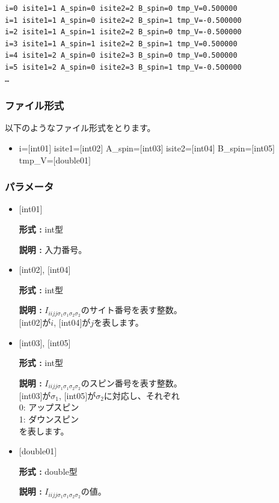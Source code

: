 \begin{minipage}{12.5cm}
\begin{screen}
\begin{verbatim}
i=0 isite1=1 A_spin=0 isite2=2 B_spin=0 tmp_V=0.500000 
i=1 isite1=1 A_spin=0 isite2=2 B_spin=1 tmp_V=-0.500000 
i=2 isite1=1 A_spin=1 isite2=2 B_spin=0 tmp_V=-0.500000 
i=3 isite1=1 A_spin=1 isite2=2 B_spin=1 tmp_V=0.500000 
i=4 isite1=2 A_spin=0 isite2=3 B_spin=0 tmp_V=0.500000 
i=5 isite1=2 A_spin=0 isite2=3 B_spin=1 tmp_V=-0.500000 
…
\end{verbatim}
\end{screen}
\end{minipage}

\subsubsection{ファイル形式}
以下のようなファイル形式をとります。
 \begin{itemize}
   \item  i=$[$int01$]$ isite1=$[$int02$]$  A\_spin=$[$int03$]$ isite2=$[$int04$]$  B\_spin=$[$int05$]$ tmp\_V=$[$double01$]$ 
 \end{itemize}
 
\subsubsection{パラメータ}
 \begin{itemize}

    \item  $[$int01$]$ 
   
    {\bf 形式 :} int型

   {\bf 説明 :} 入力番号。
      
   \item  $[$int02$]$, $[$int04$]$
   
    {\bf 形式 :} int型

    {\bf 説明 :}   $I_{iijj\sigma_1\sigma_1\sigma_2\sigma_2}$のサイト番号を表す整数。 \\
    $[$int02$]$が$i$, $[$int04$]$が$j$を表します。
 
   \item  $[$int03$]$, $[$int05$]$  
   
    {\bf 形式 :} int型

   {\bf 説明 :}  $I_{iijj\sigma_1\sigma_1\sigma_2\sigma_2}$のスピン番号を表す整数。\\
   $[$int03$]$が$\sigma_1$, $[$int05$]$が$\sigma_2$に対応し、それぞれ\\
0: アップスピン\\
1: ダウンスピン\\
を表します。
 
   \item  $[$double01$]$ 
   
    {\bf 形式 :} double型

   {\bf 説明 :} $I_{iijj\sigma_1\sigma_1\sigma_2\sigma_2}$の値。
  
\end{itemize}

